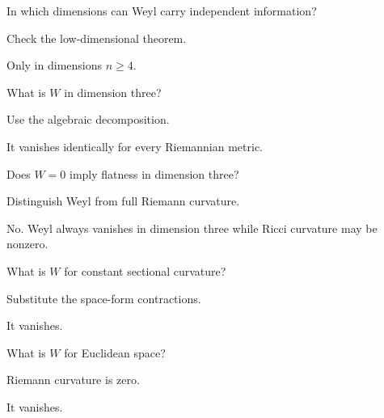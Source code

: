\begin{exercise}\label{exr:vii28-07}
In which dimensions can Weyl carry independent information?
\end{exercise}
\begin{hint}
Check the low-dimensional theorem.
\end{hint}
\begin{solution}
Only in dimensions \(n\ge4\).
\end{solution}

\begin{exercise}\label{exr:vii28-08}
What is \(W\) in dimension three?
\end{exercise}
\begin{hint}
Use the algebraic decomposition.
\end{hint}
\begin{solution}
It vanishes identically for every Riemannian metric.
\end{solution}

\begin{exercise}\label{exr:vii28-09}
Does \(W=0\) imply flatness in dimension three?
\end{exercise}
\begin{hint}
Distinguish Weyl from full Riemann curvature.
\end{hint}
\begin{solution}
No. Weyl always vanishes in dimension three while Ricci curvature may be nonzero.
\end{solution}

\begin{exercise}\label{exr:vii28-10}
What is \(W\) for constant sectional curvature?
\end{exercise}
\begin{hint}
Substitute the space-form contractions.
\end{hint}
\begin{solution}
It vanishes.
\end{solution}

\begin{exercise}\label{exr:vii28-11}
What is \(W\) for Euclidean space?
\end{exercise}
\begin{hint}
Riemann curvature is zero.
\end{hint}
\begin{solution}
It vanishes.
\end{solution}

